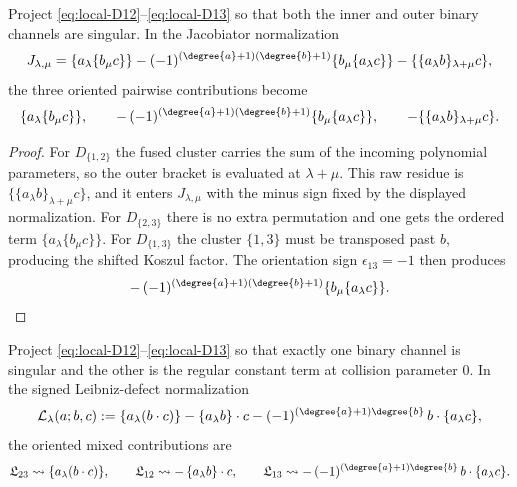 \begin{proposition}
\label{prop:ss-projection}
Project \eqref{eq:local-D12}--\eqref{eq:local-D13} so that both the inner and outer
binary channels are singular.  In the Jacobiator normalization
\[
J_{\lambda,\mu}
=
\{a_\lambda\{b_\mu c\}\}
-
(-1)^{(\degree{a}+1)(\degree{b}+1)}
\{b_\mu\{a_\lambda c\}\}
-
\{\{a_\lambda b\}_{\lambda+\mu}c\},
\]
the three oriented pairwise contributions become
\[
\{a_\lambda\{b_\mu c\}\},
\qquad
-\,(-1)^{(\degree{a}+1)(\degree{b}+1)}\{b_\mu\{a_\lambda c\}\},
\qquad
-\{\{a_\lambda b\}_{\lambda+\mu}c\}.
\]
\end{proposition}

\begin{proof}
For $D_{\{1,2\}}$ the fused cluster carries the sum of the incoming
polynomial parameters, so the outer bracket is evaluated at
$\lambda+\mu$.  This raw residue is
\(\{\{a_\lambda b\}_{\lambda+\mu}c\}\), and it enters
\(J_{\lambda,\mu}\) with the minus sign fixed by the displayed
normalization.
For $D_{\{2,3\}}$ there is no extra permutation and one gets the ordered term
$\{a_\lambda\{b_\mu c\}\}$.
For $D_{\{1,3\}}$ the cluster $\{1,3\}$ must be transposed past $b$, producing the
shifted Koszul factor. The orientation sign $\epsilon_{13}=-1$ then
produces
\[
-\,(-1)^{(\degree{a}+1)(\degree{b}+1)}
\{b_\mu\{a_\lambda c\}\}.
\]
\end{proof}

\begin{proposition}
\label{prop:mixed-projection}
Project \eqref{eq:local-D12}--\eqref{eq:local-D13} so that exactly one binary channel is
singular and the other is the regular constant term at collision
parameter $0$.  In the signed Leibniz-defect normalization
\[
\mathcal L_\lambda(a;b,c)
:=
\{a_\lambda(b\cdot c)\}
-
\{a_\lambda b\}\cdot c
-
(-1)^{(\degree{a}+1)\degree{b}}\,
b\cdot\{a_\lambda c\},
\]
the oriented mixed contributions are
\[
\mathfrak L_{23}\leadsto \{a_\lambda(b\cdot c)\},
\qquad
\mathfrak L_{12}\leadsto -\,\{a_\lambda b\}\cdot c,
\qquad
\mathfrak L_{13}\leadsto
-\,(-1)^{(\degree{a}+1)\degree{b}}\,b\cdot\{a_\lambda c\}.
\]
\end{proposition}

